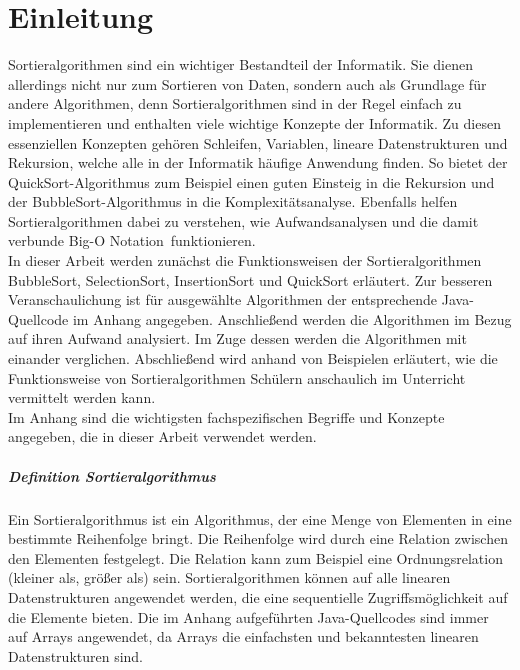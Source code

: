 \documentclass[./entry.tex]{subfiles}
\begin{document}
    \chapter{Einleitung}

    Sortieralgorithmen sind ein wichtiger Bestandteil der Informatik.
    Sie dienen allerdings nicht nur zum Sortieren von Daten,
    sondern auch als Grundlage für andere Algorithmen,
    denn Sortieralgorithmen sind in der Regel einfach zu implementieren
    und enthalten viele wichtige Konzepte der Informatik.
    Zu diesen essenziellen Konzepten gehören Schleifen,
    Variablen, lineare Datenstrukturen und Rekursion, welche
    alle in der Informatik häufige Anwendung finden.
    So bietet der QuickSort-Algorithmus zum Beispiel einen guten Einsteig in die Rekursion
    und der BubbleSort-Algorithmus in die Komplexitätsanalyse.
    Ebenfalls helfen Sortieralgorithmen dabei zu verstehen,
    wie Aufwandsanalysen und die damit verbunde \dq Big-O Notation\dq\ funktionieren. \\


    In dieser Arbeit werden zunächst die Funktionsweisen der Sortieralgorithmen
    BubbleSort, SelectionSort, InsertionSort und QuickSort erläutert.
    Zur besseren Veranschaulichung ist für ausgewählte Algorithmen der entsprechende Java-Quellcode im Anhang angegeben.
    Anschließend werden die Algorithmen im Bezug auf ihren Aufwand analysiert.
    Im Zuge dessen werden die Algorithmen mit einander verglichen.
    Abschließend wird anhand von Beispielen erläutert, wie die Funktionsweise
    von Sortieralgorithmen Schülern anschaulich im Unterricht vermittelt werden kann. \\

    Im Anhang sind die wichtigsten fachspezifischen Begriffe und Konzepte
    angegeben, die in dieser Arbeit verwendet werden. \\

    \paragraph{Definition Sortieralgorithmus}
    Ein Sortieralgorithmus ist ein Algorithmus, der eine Menge von Elementen in eine bestimmte Reihenfolge bringt.
    Die Reihenfolge wird durch eine Relation zwischen den Elementen festgelegt.
    Die Relation kann zum Beispiel eine Ordnungsrelation (kleiner als, größer als) sein.
    Sortieralgorithmen können auf alle linearen Datenstrukturen angewendet werden,
    die eine sequentielle Zugriffsmöglichkeit auf die Elemente bieten.
    Die im Anhang aufgeführten Java-Quellcodes sind immer auf Arrays angewendet,
    da Arrays die einfachsten und bekanntesten linearen Datenstrukturen sind.
\end{document}
